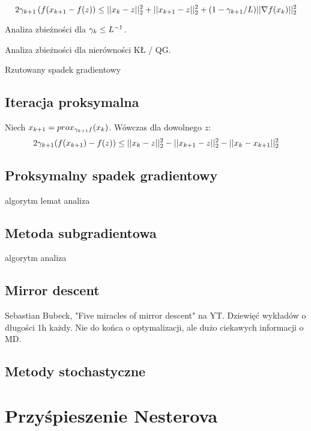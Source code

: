 \documentclass[10pt,a4paper,draft]{report}
\begin{document}
\begin{theorem}
\[
2\gamma_{k+1} \left(f(x_{k+1} - f(z) \right) \leq ||x_k - z||_2^2 + ||x_{k+1} -z||_2^2 + (1 - \gamma_{k+1}/L) ||\nabla f(x_k)||_2^2 
\]
\end{theorem}
\begin{theorem}
Analiza zbieżności dla $\gamma_k \leq L^{-1}$.
\end{theorem}
\begin{theorem}
Analiza zbieżności dla nierówności KŁ / QG.
\end{theorem}
\begin{theorem}
Rzutowany spadek gradientowy
\end{theorem}
\section{Iteracja proksymalna}

\begin{theorem}
Niech $x_{k+1} = prox_{\gamma_{k+1} f} (x_k)$. Wówczas dla dowolnego $z$:
\[
2\gamma_{k+1}(f(x_{k+1}) - f(z)) \leq ||x_k - z||_2^2 - ||x_{k+1} - z||_2^2 - ||x_{k} - x_{k+1}||_2^2
\]
\end{theorem}

\section{Proksymalny spadek gradientowy}
algorytm
lemat
analiza
\section{Metoda subgradientowa}
algorytm
analiza

\section{Mirror descent}

Sebastian Bubeck, "Five miracles of mirror descent" na YT. Dziewięć wykładów o długości 1h każdy. Nie do końca o optymalizacji, ale dużo ciekawych informacji o MD.

\section{Metody stochastyczne}

\chapter{Przyśpieszenie Nesterova}
\end{document}
